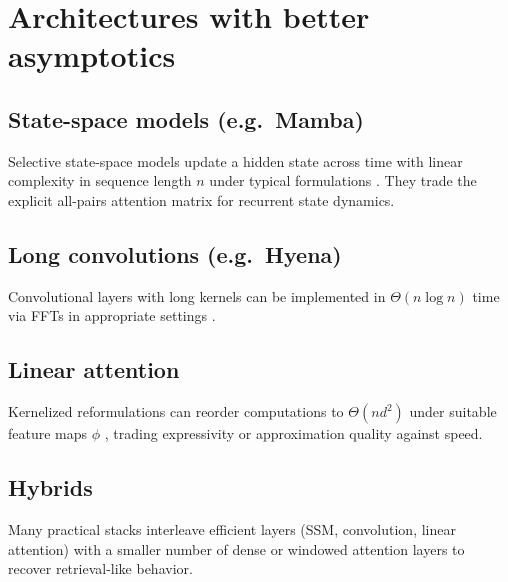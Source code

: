 \chapter{Architectures with better asymptotics}

\section{State-space models (e.g.\ Mamba)}

Selective state-space models update a hidden state across time with linear complexity in sequence length $n$
under typical formulations \cite{gu2023mamba}. They trade the explicit all-pairs attention matrix for recurrent
state dynamics.

\section{Long convolutions (e.g.\ Hyena)}

Convolutional layers with long kernels can be implemented in $\Theta(n \log n)$ time via FFTs in appropriate
settings \cite{poli2023hyena}.

\section{Linear attention}

Kernelized reformulations can reorder computations to $\Theta(n d^2)$ under suitable feature maps $\phi$
\cite{katharopoulos2020transformers}, trading expressivity or approximation quality against speed.

\section{Hybrids}

Many practical stacks interleave efficient layers (SSM, convolution, linear attention) with a smaller number
of dense or windowed attention layers to recover retrieval-like behavior.
